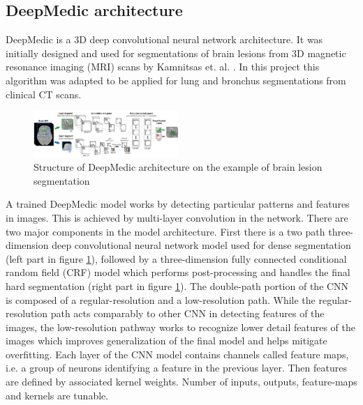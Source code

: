 \subsection{DeepMedic architecture}\label{deepmedic_chapter}
DeepMedic is a 3D deep convolutional neural network architecture. It was initially designed and used for segmentations of brain lesions from 3D magnetic resonance imaging (MRI) scans by Kamnitsas et. al. \cite{deepmedic}. In this project this algorithm was adapted to be applied for lung and bronchus segmentations from clinical CT scans. \newline
\begin{figure}[h!]
	\includegraphics[width=0.49\textwidth, angle=0]{files/deepMedic.png}
	\caption{Structure of DeepMedic architecture on the example of brain lesion segmentation \cite{deepmedic}}
	\label{deepmedic}
\end{figure}
 
A trained DeepMedic model works by detecting particular patterns and features in images. This is achieved by multi-layer convolution in the network. There are two major components in the model architecture. First there is a two path three-dimension deep convolutional neural network model used for dense segmentation (left part in figure \ref{deepmedic}), followed by a three-dimension fully connected conditional random field (CRF) model which performs post-processing and handles the final hard segmentation (right part in figure \ref{deepmedic}). The double-path portion of the CNN is composed of a regular-resolution and a low-resolution path. While the regular-resolution path acts comparably to other CNN in detecting features of the images, the low-resolution pathway works to recognize lower detail features of the images which improves generalization of the final model and helps mitigate overfitting.
Each layer of the CNN model contains channels called feature maps, i.e. a group of neurons identifying a feature in the previous layer. Then features are defined by associated kernel weights. Number of inputs, outputs, feature-maps and kernels are tunable.

